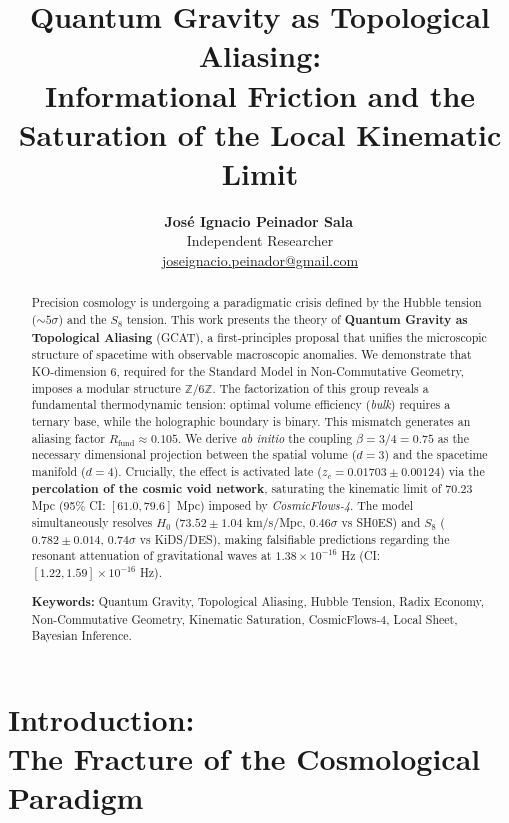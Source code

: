 \documentclass[12pt, a4paper]{article}
\title{\textbf{Quantum Gravity as Topological Aliasing:} \\ Informational Friction and the Saturation of the Local Kinematic Limit}
\author{
  \textbf{José Ignacio Peinador Sala}\,\orcidlink{0009-0008-1822-3452} \\
  Independent Researcher \\[2pt]
  \small\href{mailto:joseignacio.peinador@gmail.com}{joseignacio.peinador@gmail.com}
}
\date{}
\theoremstyle{plain}
\theoremstyle{definition}
\begin{document}
\maketitle

\begin{abstract}
\noindent
Precision cosmology is undergoing a paradigmatic crisis defined by the Hubble tension ($\sim 5\sigma$) and the $S_8$ tension. This work presents the theory of \textbf{Quantum Gravity as Topological Aliasing} (GCAT), a first-principles proposal that unifies the microscopic structure of spacetime with observable macroscopic anomalies. We demonstrate that KO-dimension 6, required for the Standard Model in Non-Commutative Geometry, imposes a modular structure $\mathbb{Z}/6\mathbb{Z}$. The factorization of this group reveals a fundamental thermodynamic tension: optimal volume efficiency (\textit{bulk}) requires a ternary base, while the holographic boundary is binary. This mismatch generates an aliasing factor $R_{\text{fund}} \approx 0.105$. We derive \textit{ab initio} the coupling $\beta = 3/4 = 0.75$ as the necessary dimensional projection between the spatial volume ($d=3$) and the spacetime manifold ($d=4$). Crucially, the effect is activated late ($z_c = 0.01703 \pm 0.00124$) via the \textbf{percolation of the cosmic void network}, saturating the kinematic limit of $70.23$ Mpc (95\% CI: $[61.0, 79.6]$ Mpc) imposed by \textit{CosmicFlows-4}. The model simultaneously resolves $H_0$ ($73.52 \pm 1.04$ km/s/Mpc, $0.46\sigma$ vs SH0ES) and $S_8$ ($0.782 \pm 0.014$, $0.74\sigma$ vs KiDS/DES), making falsifiable predictions regarding the resonant attenuation of gravitational waves at $1.38 \times 10^{-16}$ Hz (CI: $[1.22, 1.59] \times 10^{-16}$ Hz).

\vspace{0.5cm}
\noindent \textbf{Keywords:} Quantum Gravity, Topological Aliasing, Hubble Tension, Radix Economy, Non-Commutative Geometry, Kinematic Saturation, CosmicFlows-4, Local Sheet, Bayesian Inference.
\end{abstract}

\section[Introduction: The Fracture of the Cosmological Paradigm]{Introduction: \\ The Fracture of the Cosmological Paradigm}
\label{sec:introduction}
\end{document}
